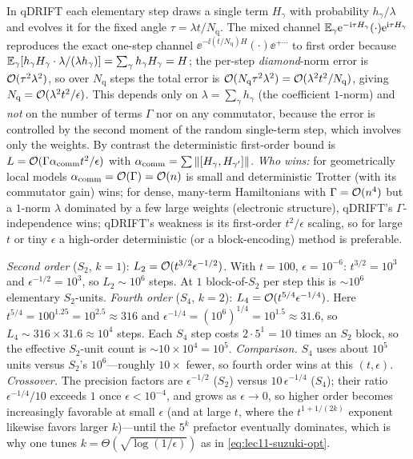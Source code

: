 \begin{solution}
In qDRIFT each elementary step draws a single term $H_\gamma$ with probability
$h_\gamma/\lambda$ and evolves it for the fixed angle $\tau=\lambda t/N_{\mathrm q}$. The
mixed channel $\mathbb{E}_\gamma\mathrm{e}^{-\mathrm{i}\tau H_\gamma}(\cdot)\mathrm{e}^{\mathrm{i}\tau H_\gamma}$ reproduces
the exact one-step channel $\ee^{-\ii(t/N_{\mathrm q})H}(\cdot)\ee^{+\cdots}$ to first
order because $\mathbb{E}_\gamma[h_\gamma H_\gamma\cdot\lambda/(\lambda h_\gamma)]=\sum_\gamma
h_\gamma H_\gamma=H$; the per-step \emph{diamond}-norm error is $\mathcal{O}(\tau^2\lambda^2)$,
so over $N_{\mathrm q}$ steps the total error is $\mathcal{O}(N_{\mathrm q}\tau^2\lambda^2)
=\mathcal{O}(\lambda^2t^2/N_{\mathrm q})$, giving $N_{\mathrm q}=\mathcal{O}(\lambda^2t^2/\epsilon)$.
This depends only on $\lambda=\sum_\gamma h_\gamma$ (the coefficient $1$-norm) and
\emph{not} on the number of terms $\Gamma$ nor on any commutator, because the error is
controlled by the second moment of the random single-term step, which involves only the
weights. By contrast the deterministic first-order bound is
$L=\mathcal{O}(\Gamma\alpha_{\mathrm{comm}}t^2/\epsilon)$ with $\alpha_{\mathrm{comm}}
=\sum\left\lVert [H_\gamma,H_{\gamma'}] \right\rVert$. \emph{Who wins:} for geometrically local models
$\alpha_{\mathrm{comm}}=\mathcal{O}(\Gamma)=\mathcal{O}(n)$ is small and deterministic Trotter (with
its commutator gain) wins; for dense, many-term Hamiltonians with $\Gamma=\mathcal{O}(n^4)$ but
a $1$-norm $\lambda$ dominated by a few large weights (electronic structure), qDRIFT's
$\Gamma$-independence wins; qDRIFT's weakness is its first-order $t^2/\epsilon$ scaling, so
for large $t$ or tiny $\epsilon$ a high-order deterministic (or a block-encoding) method is
preferable.
\end{solution}

\begin{solution}
\emph{Second order} ($S_2$, $k=1$): $L_2=\mathcal{O}(t^{3/2}\epsilon^{-1/2})$. With $t=100$,
$\epsilon=10^{-6}$: $t^{3/2}=10^3$ and $\epsilon^{-1/2}=10^3$, so $L_2\sim10^{6}$ steps.
At $1$ block-of-$S_2$ per step this is $\sim10^{6}$ elementary $S_2$-units.
\emph{Fourth order} ($S_4$, $k=2$): $L_4=\mathcal{O}(t^{5/4}\epsilon^{-1/4})$. Here
$t^{5/4}=100^{1.25}=10^{2.5}\approx316$ and $\epsilon^{-1/4}=(10^6)^{1/4}=10^{1.5}\approx
31.6$, so $L_4\sim316\times31.6\approx10^{4}$ steps. Each $S_4$ step costs
$2\cdot5^{1}=10$ times an $S_2$ block, so the effective $S_2$-unit count is
$\sim10\times10^{4}=10^{5}$. \emph{Comparison.} $S_4$ uses about $10^{5}$ units versus
$S_2$'s $10^{6}$---roughly $10\times$ fewer, so fourth order wins at this
$(t,\epsilon)$. \emph{Crossover.} The precision factors are $\epsilon^{-1/2}$ ($S_2$)
versus $10\,\epsilon^{-1/4}$ ($S_4$); their ratio $\epsilon^{-1/4}/10$ exceeds $1$ once
$\epsilon<10^{-4}$, and grows as $\epsilon\to0$, so higher order becomes increasingly
favorable at small $\epsilon$ (and at large $t$, where the $t^{1+1/(2k)}$ exponent likewise
favors larger $k$)---until the $5^{k}$ prefactor eventually dominates, which is why one
tunes $k=\Theta(\sqrt{\log(1/\epsilon)})$ as in \eqref{eq:lec11-suzuki-opt}.
\end{solution}
